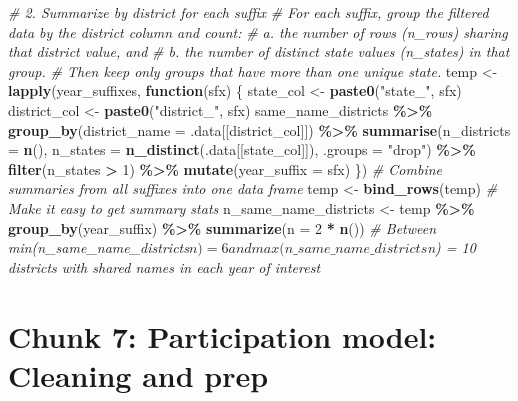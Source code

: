 \documentclass[
]{article}
\newenvironment{Shaded}{\begin{snugshade}}{\end{snugshade}}
\newcommand{\AttributeTok}[1]{\textcolor[rgb]{0.13,0.29,0.53}{#1}}
\newcommand{\CommentTok}[1]{\textcolor[rgb]{0.56,0.35,0.01}{\textit{#1}}}
\newcommand{\ControlFlowTok}[1]{\textcolor[rgb]{0.13,0.29,0.53}{\textbf{#1}}}
\newcommand{\DecValTok}[1]{\textcolor[rgb]{0.00,0.00,0.81}{#1}}
\newcommand{\FunctionTok}[1]{\textcolor[rgb]{0.13,0.29,0.53}{\textbf{#1}}}
\newcommand{\NormalTok}[1]{#1}
\newcommand{\OtherTok}[1]{\textcolor[rgb]{0.56,0.35,0.01}{#1}}
\newcommand{\SpecialCharTok}[1]{\textcolor[rgb]{0.81,0.36,0.00}{\textbf{#1}}}
\newcommand{\StringTok}[1]{\textcolor[rgb]{0.31,0.60,0.02}{#1}}
\begin{document}
\begin{Shaded}
\begin{Highlighting}[]
\CommentTok{\# 2. Summarize by district for each suffix}
\CommentTok{\# For each suffix, group the filtered data by the district column and count:}
\CommentTok{\# a. the number of rows (n\_rows) sharing that district value, and }
\CommentTok{\# b. the number of distinct state values (n\_states) in that group.}
\CommentTok{\# Then keep only groups that have more than one unique state.}
\NormalTok{temp }\OtherTok{\textless{}{-}} \FunctionTok{lapply}\NormalTok{(year\_suffixes, }\ControlFlowTok{function}\NormalTok{(sfx) \{}
\NormalTok{  state\_col }\OtherTok{\textless{}{-}} \FunctionTok{paste0}\NormalTok{(}\StringTok{"state\_"}\NormalTok{, sfx)}
\NormalTok{  district\_col }\OtherTok{\textless{}{-}} \FunctionTok{paste0}\NormalTok{(}\StringTok{"district\_"}\NormalTok{, sfx)}
\NormalTok{  same\_name\_districts }\SpecialCharTok{\%\textgreater{}\%}
    \FunctionTok{group\_by}\NormalTok{(}\AttributeTok{district\_name =}\NormalTok{ .data[[district\_col]]) }\SpecialCharTok{\%\textgreater{}\%}
    \FunctionTok{summarise}\NormalTok{(}\AttributeTok{n\_districts =} \FunctionTok{n}\NormalTok{(),}
              \AttributeTok{n\_states =} \FunctionTok{n\_distinct}\NormalTok{(.data[[state\_col]]),}
              \AttributeTok{.groups =} \StringTok{"drop"}\NormalTok{) }\SpecialCharTok{\%\textgreater{}\%}
    \FunctionTok{filter}\NormalTok{(n\_states }\SpecialCharTok{\textgreater{}} \DecValTok{1}\NormalTok{) }\SpecialCharTok{\%\textgreater{}\%}
    \FunctionTok{mutate}\NormalTok{(}\AttributeTok{year\_suffix =}\NormalTok{ sfx)}
\NormalTok{\})}
\CommentTok{\# Combine summaries from all suffixes into one data frame}
\NormalTok{temp }\OtherTok{\textless{}{-}} \FunctionTok{bind\_rows}\NormalTok{(temp)}
\CommentTok{\# Make it easy to get summary stats}
\NormalTok{n\_same\_name\_districts }\OtherTok{\textless{}{-}}\NormalTok{ temp }\SpecialCharTok{\%\textgreater{}\%} 
    \FunctionTok{group\_by}\NormalTok{(year\_suffix) }\SpecialCharTok{\%\textgreater{}\%} 
    \FunctionTok{summarize}\NormalTok{(}\AttributeTok{n =} \DecValTok{2} \SpecialCharTok{*} \FunctionTok{n}\NormalTok{())}
\CommentTok{\# Between min(n\_same\_name\_districts$n) = 6 and max(n\_same\_name\_districts$n) = 10 districts with shared names in each year of interest}
\end{Highlighting}
\end{Shaded}

\section*{Chunk 7: Participation model: Cleaning and prep}\label{chunk-7-participation-model-cleaning-and-prep}
\end{document}
